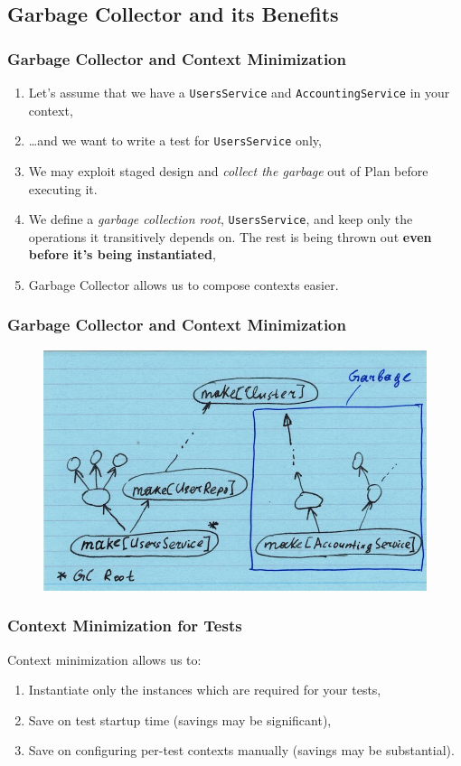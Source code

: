\documentclass[usenames,dvipsnames]{beamer}
\begin{document}
\subsection{Garbage Collector and its Benefits}

\begin{frame}
\frametitle{Garbage Collector and Context Minimization}
\begin{enumerate}
\item Let's assume that we have a \texttt{UsersService} and \texttt{AccountingService} 
      in your context,
\item \dots and we want to write a test for \texttt{UsersService} only,
\item We may exploit staged design and \textit{collect the garbage} out of Plan before executing it.
\item We define a \textit{garbage collection root}, \texttt{UsersService}, and keep only 
the operations it transitively depends on. The rest is being thrown out \textbf{even before it's being instantiated},
\item Garbage Collector allows us to compose contexts easier.
\end{enumerate}
\end{frame}

\begin{frame}
\frametitle{Garbage Collector and Context Minimization}
\begin{figure}
    \includegraphics[width=\textwidth]{media/gc-ex.jpg}
\end{figure}
\end{frame}

\begin{frame}
\frametitle{Context Minimization for Tests}
Context minimization allows us to:
\begin{enumerate}
\item Instantiate only the instances which are required for your tests,
\item Save on test startup time (savings may be significant),
\item Save on configuring per-test contexts manually (savings may be substantial).
\end{enumerate}
\end{frame}
\end{document}
